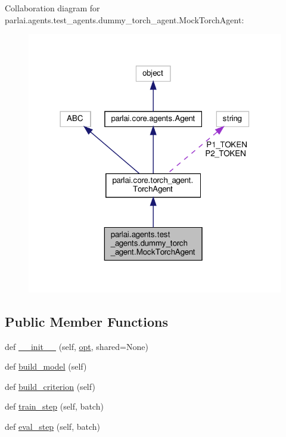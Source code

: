 Collaboration diagram for parlai.\+agents.\+test\+\_\+agents.\+dummy\+\_\+torch\+\_\+agent.\+Mock\+Torch\+Agent\+:
\nopagebreak
\begin{figure}[H]
\begin{center}
\leavevmode
\includegraphics[width=318pt]{d0/d8a/classparlai_1_1agents_1_1test__agents_1_1dummy__torch__agent_1_1MockTorchAgent__coll__graph}
\end{center}
\end{figure}
\subsection*{Public Member Functions}
\begin{DoxyCompactItemize}
\item 
def \hyperlink{classparlai_1_1agents_1_1test__agents_1_1dummy__torch__agent_1_1MockTorchAgent_af14024f59e4ea3dea5c7ff38caff89ad}{\+\_\+\+\_\+init\+\_\+\+\_\+} (self, \hyperlink{classparlai_1_1core_1_1torch__agent_1_1TorchAgent_a785bb920cf8c8afc3e9bf6a8b77e335a}{opt}, shared=None)
\item 
def \hyperlink{classparlai_1_1agents_1_1test__agents_1_1dummy__torch__agent_1_1MockTorchAgent_a8d6b885ba3adcee439eab49922e584a4}{build\+\_\+model} (self)
\item 
def \hyperlink{classparlai_1_1agents_1_1test__agents_1_1dummy__torch__agent_1_1MockTorchAgent_a457b269132e6c4ec92308ce87aa85336}{build\+\_\+criterion} (self)
\item 
def \hyperlink{classparlai_1_1agents_1_1test__agents_1_1dummy__torch__agent_1_1MockTorchAgent_a867115faed3455518fb1f9a0ab41f761}{train\+\_\+step} (self, batch)
\item 
def \hyperlink{classparlai_1_1agents_1_1test__agents_1_1dummy__torch__agent_1_1MockTorchAgent_aea8dfe6e44a419f31e741c4770a82f9b}{eval\+\_\+step} (self, batch)
\end{DoxyCompactItemize}
